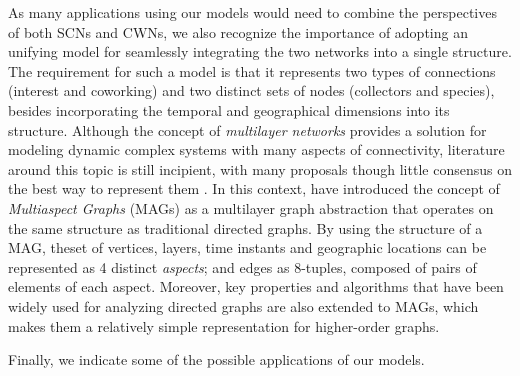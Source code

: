 As many applications using our models would need to combine the perspectives of both SCNs and CWNs, we also recognize the importance of adopting an unifying model for seamlessly integrating the two networks into a single structure.
The requirement for such a model is that it represents two types of connections (interest and coworking) and two distinct sets of nodes (collectors and species), besides incorporating the temporal and geographical dimensions into its structure.
Although the concept of \textit{multilayer networks} provides a solution for modeling dynamic complex systems with many aspects of connectivity, literature around this topic is still incipient, with many proposals though little consensus on the best way to represent them \cite{Kivela2014}.
In this context,  have introduced the concept of \textit{Multiaspect Graphs} (MAGs) as a multilayer graph abstraction that operates on the same structure as traditional directed graphs.
By using the structure of a MAG, theset of vertices, layers, time instants and geographic locations can be represented as 4 distinct \textit{aspects}; and edges as $8$-tuples, composed of pairs of elements of each aspect.
Moreover, key properties and algorithms that have been widely used for analyzing directed graphs are also extended to MAGs, which makes them a relatively simple representation for higher-order graphs.



Finally, we indicate some of the possible applications of our models.


